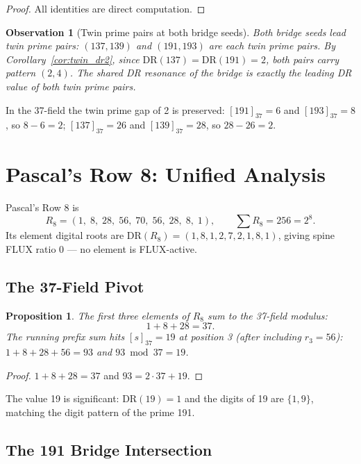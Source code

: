 \documentclass[12pt]{article}
\newtheorem{proposition}[theorem]{Proposition}
\newtheorem{observation}[theorem]{Observation}
\begin{document}
\begin{proof}
All identities are direct computation.
\end{proof}

\begin{observation}[Twin prime pairs at both bridge seeds]
Both bridge seeds lead twin prime pairs:
$(137, 139)$ and $(191, 193)$ are each twin prime pairs.
By Corollary~\ref{cor:twin_dr2}, since $\mathrm{DR}(137)=\mathrm{DR}(191)=2$,
both pairs carry pattern $(2,4)$.  The shared DR resonance of the bridge
is exactly the leading DR value of both twin prime pairs.
\end{observation}

In the 37-field the twin prime gap of 2 is preserved:
$[191]_{37}=6$ and $[193]_{37}=8$, so $8-6=2$;
$[137]_{37}=26$ and $[139]_{37}=28$, so $28-26=2$.

\section{Pascal's Row 8: Unified Analysis}
\label{sec:pascal}

Pascal's Row 8 is
\[
    R_8 = (1,\;8,\;28,\;56,\;70,\;56,\;28,\;8,\;1),
    \qquad \sum R_8 = 256 = 2^8.
\]
Its element digital roots are $\mathrm{DR}(R_8) = (1,8,1,2,7,2,1,8,1)$, giving
spine FLUX ratio 0 --- no element is FLUX-active.

\subsection{The 37-Field Pivot}

\begin{proposition}
\label{prop:pascal37}
The first three elements of $R_8$ sum to the 37-field modulus:
\[
    1 + 8 + 28 = 37.
\]
The running prefix sum hits $[s]_{37}=19$ at position 3
(after including $r_3=56$): $1+8+28+56=93$ and $93\bmod 37 = 19$.
\end{proposition}

\begin{proof}
$1+8+28=37$ and $93=2\cdot37+19$.
\end{proof}

The value 19 is significant: $\mathrm{DR}(19)=1$ and the digits of 19 are
$\{1,9\}$, matching the digit pattern of the prime 191.

\subsection{The 191 Bridge Intersection}
\end{document}
